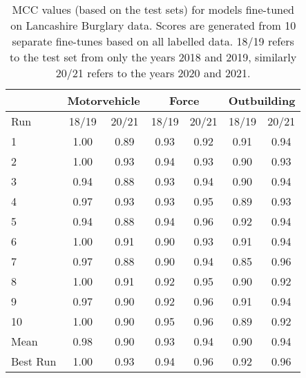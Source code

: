 \begin{table}[]
\centering
\begin{tabular}{@{}lcccccc@{}}
\toprule
         & \multicolumn{2}{c}{Motorvehicle} & \multicolumn{2}{c}{Force} & \multicolumn{2}{c}{Outbuilding} \\ \midrule
Run      & 18/19           & 20/21          & 18/19       & 20/21       & 18/19          & 20/21          \\
1        & 1.00            & 0.89           & 0.93        & 0.92        & 0.91           & 0.94           \\
2        & 1.00            & 0.93           & 0.94        & 0.93        & 0.90           & 0.93           \\
3        & 0.94            & 0.88           & 0.93        & 0.94        & 0.90           & 0.94           \\
4        & 0.97            & 0.93           & 0.93        & 0.95        & 0.89           & 0.93           \\
5        & 0.94            & 0.88           & 0.94        & 0.96        & 0.92           & 0.94           \\
6        & 1.00            & 0.91           & 0.90        & 0.93        & 0.91           & 0.94           \\
7        & 0.97            & 0.88           & 0.90        & 0.94        & 0.85           & 0.96           \\
8        & 1.00            & 0.91           & 0.92        & 0.95        & 0.90           & 0.92           \\
9        & 0.97            & 0.90           & 0.92        & 0.96        & 0.91           & 0.94           \\
10       & 1.00            & 0.90           & 0.95        & 0.96        & 0.89           & 0.92           \\\midrule
Mean     & 0.98            & 0.90           & 0.93        & 0.94        & 0.90           & 0.94           \\\midrule
Best Run & 1.00            & 0.93           & 0.94        & 0.96        & 0.92           & 0.96           \\ \bottomrule
\end{tabular}
\caption[Final model MCC metrics. PF2 data. All models.]{\label{tab:lancs_mcc}MCC values (based on the test sets) for models fine-tuned on Lancashire Burglary data. Scores are generated from 10 separate fine-tunes based on all labelled data. 18/19 refers to the test set from only the years 2018 and 2019, similarly 20/21 refers to the years 2020 and 2021.}
\end{table}




